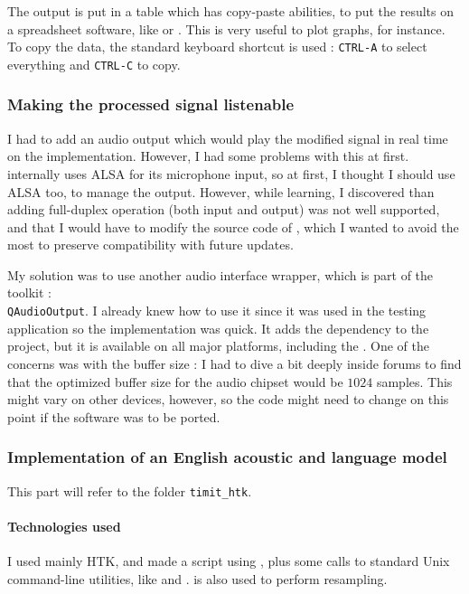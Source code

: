 The output is put in a table which has copy-paste abilities, to put the results on a spreadsheet software, like  or . This is very useful to plot graphs, for instance.
To copy the data, the standard keyboard shortcut is used : \texttt{CTRL-A} to select everything and \texttt{CTRL-C} to copy.

\subsubsection{Making the processed signal listenable}
I had to add an audio output which would play the modified signal in real time on the  implementation. However, I had some problems with this at first.  internally uses \ac{ALSA} for its microphone input, so at first, I thought I should use \ac{ALSA} too, to manage the output. However, while learning, I discovered than adding full-duplex operation (both input and output) was not well supported, and that I would have to modify the source code of , which I wanted to avoid the most to preserve compatibility with future updates.

My solution was to use another audio interface wrapper, which is part of the  toolkit :\\ \texttt{QAudioOutput}. I already knew how to use it since it was used in the testing application so the implementation was quick. It adds the  dependency to the project, but it is available on all major platforms, including the . One of the concerns was with the buffer size : I had to dive a bit deeply inside  forums to find that the optimized buffer size for the audio chipset would be $1024$ samples. This might vary on other devices, however, so the code might need to change on this point if the software was to be ported.

\subsubsection{Implementation of an English acoustic and language model}
This part will refer to the folder \texttt{timit\_htk}. 
\paragraph{Technologies used}
I used mainly \ac{HTK}, and made a script using , plus some calls to standard Unix command-line utilities, like  and .  is also used to perform resampling.
